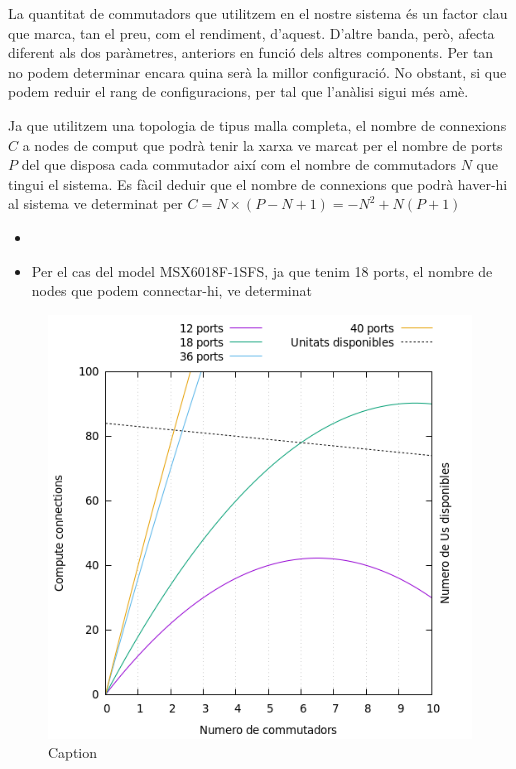 La quantitat de commutadors que utilitzem en el nostre sistema és un factor clau que marca,
tan el preu, com el rendiment, d'aquest. D'altre banda, però, afecta diferent als dos paràmetres,
anteriors en funció dels altres components. Per tan no podem determinar encara quina serà la
millor configuració. No obstant, si que podem reduir el rang de configuracions, per tal que
l'anàlisi sigui més amè.

Ja que utilitzem una topologia de tipus malla completa, el nombre de connexions $C$ a nodes de comput
que podrà tenir la xarxa ve marcat per el nombre de ports $P$ del que disposa cada commutador així
com el nombre de commutadors $N$ que tingui el sistema. Es fàcil deduir que el nombre de connexions
que podrà haver-hi al sistema ve determinat per $C = N \times ( P - N + 1 ) = -N^2 + N(P+1)$
\begin{itemize}
  \item 
  \item Per el cas del model MSX6018F-1SFS, ja que tenim 18 ports, el nombre de nodes que
    podem connectar-hi, ve determinat
\end{itemize}

\begin{figure}[h!]
    \centering
    \includegraphics[width=0.8\linewidth]{img/connections.png}
    \caption{Caption}
    \label{fig:connections}
\end{figure}

